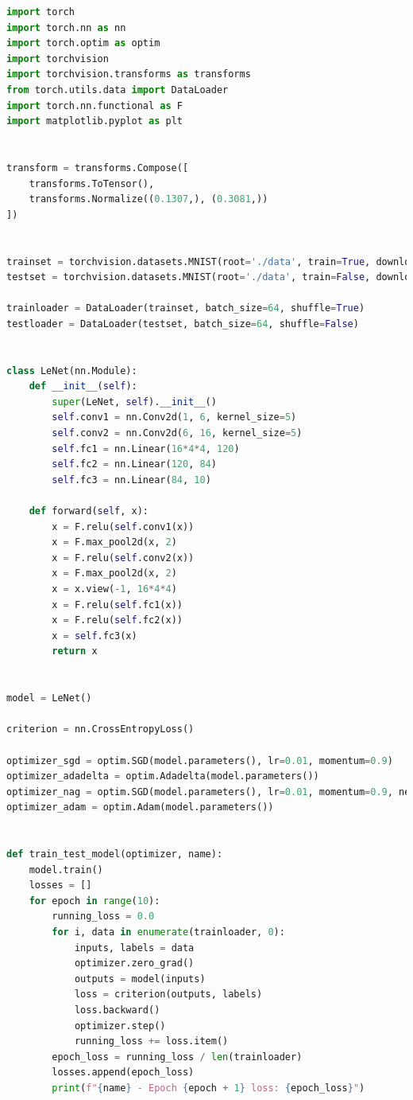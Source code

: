 \documentclass[a4paper, 14pt]{extarticle}
\begin{document}
\begin{lstlisting}[language={python},caption={LeNet},label={lst:code1}]
import torch
import torch.nn as nn
import torch.optim as optim
import torchvision
import torchvision.transforms as transforms
from torch.utils.data import DataLoader
import torch.nn.functional as F
import matplotlib.pyplot as plt


transform = transforms.Compose([
    transforms.ToTensor(),
    transforms.Normalize((0.1307,), (0.3081,))
])


trainset = torchvision.datasets.MNIST(root='./data', train=True, download=True, transform=transform)
testset = torchvision.datasets.MNIST(root='./data', train=False, download=True, transform=transform)

trainloader = DataLoader(trainset, batch_size=64, shuffle=True)
testloader = DataLoader(testset, batch_size=64, shuffle=False)


class LeNet(nn.Module):
    def __init__(self):
        super(LeNet, self).__init__()
        self.conv1 = nn.Conv2d(1, 6, kernel_size=5)
        self.conv2 = nn.Conv2d(6, 16, kernel_size=5)
        self.fc1 = nn.Linear(16*4*4, 120)
        self.fc2 = nn.Linear(120, 84)
        self.fc3 = nn.Linear(84, 10)

    def forward(self, x):
        x = F.relu(self.conv1(x))
        x = F.max_pool2d(x, 2)
        x = F.relu(self.conv2(x))
        x = F.max_pool2d(x, 2)
        x = x.view(-1, 16*4*4)
        x = F.relu(self.fc1(x))
        x = F.relu(self.fc2(x))
        x = self.fc3(x)
        return x


model = LeNet()

criterion = nn.CrossEntropyLoss()

optimizer_sgd = optim.SGD(model.parameters(), lr=0.01, momentum=0.9)
optimizer_adadelta = optim.Adadelta(model.parameters())
optimizer_nag = optim.SGD(model.parameters(), lr=0.01, momentum=0.9, nesterov=True)
optimizer_adam = optim.Adam(model.parameters())


def train_test_model(optimizer, name):
    model.train()
    losses = []
    for epoch in range(10):
        running_loss = 0.0
        for i, data in enumerate(trainloader, 0):
            inputs, labels = data
            optimizer.zero_grad()
            outputs = model(inputs)
            loss = criterion(outputs, labels)
            loss.backward()
            optimizer.step()
            running_loss += loss.item()
        epoch_loss = running_loss / len(trainloader)
        losses.append(epoch_loss)
        print(f"{name} - Epoch {epoch + 1} loss: {epoch_loss}")


\end{lstlisting}
\end{document}
